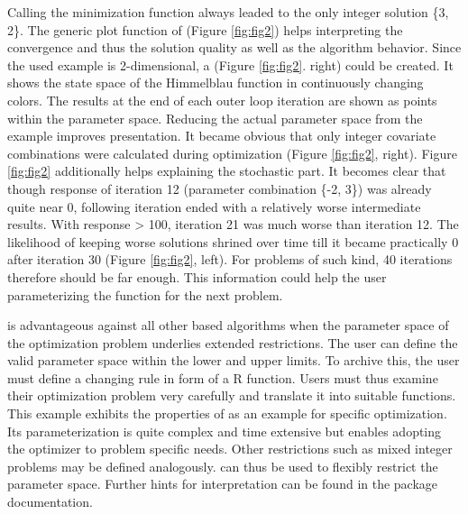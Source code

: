 Calling the minimization function always leaded to the only integer solution \{3, 2\}. The generic plot function of  (Figure \ref{fig:fig2}) helps interpreting the convergence and thus the solution quality as well as the algorithm behavior. Since the used example is 2-dimensional, a  (Figure \ref{fig:fig2}. right) could be created. It shows the state space of the Himmelblau function in continuously changing colors. The results at the end of each outer loop iteration are shown as points within the parameter space. Reducing the actual parameter space from the example improves presentation. It became obvious that only integer covariate combinations were calculated during optimization (Figure \ref{fig:fig2}, right). Figure \ref{fig:fig2} additionally helps explaining the stochastic part. It becomes clear that though response of iteration 12 (parameter combination \{-2, 3\}) was already quite near 0, following iteration ended with a relatively worse intermediate results. With response > 100, iteration 21 was much worse than iteration 12. The likelihood of keeping worse solutions shrined over time till it became practically 0 after iteration 30 (Figure \ref{fig:fig2}, left). For problems of such kind, 40 iterations therefore should be far enough. This information could help the user parameterizing the function for the next problem.

 is advantageous against all other  based algorithms when the parameter space of the optimization problem underlies extended restrictions. The user can define the valid parameter space within the lower and upper limits. To archive this, the user must define a changing rule in form of a R function. Users must thus examine their optimization problem very carefully and translate it into suitable functions. This example exhibits the properties of  as an example for specific optimization. Its parameterization is quite complex and time extensive but enables adopting the optimizer to problem specific needs. Other restrictions such as mixed integer problems may be defined analogously.  can thus be used to flexibly restrict the parameter space. Further hints for interpretation can be found in the package documentation.

